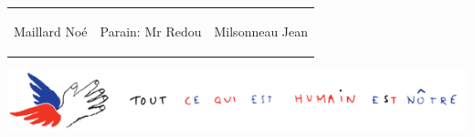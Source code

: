 \documentclass[a4paper, 12pt]{article}
\begin{document}
\begin{center}
\vskip2cm
\begin{tabular}{p{4cm} p{4cm} p{4cm}}
\begin{center}Maillard Noé\end{center} 
&
\begin{center}Parain: Mr Redou\end{center}
&
\begin{center}Milsonneau Jean\end{center}
\end{tabular}
\end{center}

\includegraphics[width=16cm]{banner.png}
\end{document}
